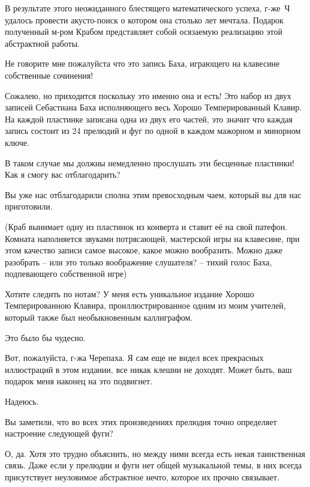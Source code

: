 \documentclass[../main.tex]{subfiles}
\begin{document}
\begin{dialogue}
 В результате этого неожиданного блестящего математического успеха, г-же~Ч удалось провести акусто-поиск о котором она столько лет мечтала. Подарок полученный м-ром Крабом представляет собой осязаемую реализацию этой абстрактной работы.

 Не говорите мне пожалуйста что это запись Баха, играющего на клавесине собственные сочинения!

 Сожалею, но приходится поскольку это именно она и есть! Это набор из двух записей Себастиана Баха исполняющего весь Хорошо Темперированный Клавир. На каждой пластинке записана одна из двух его частей, это значит что каждая запись состоит из 24 прелюдий и фуг по одной в каждом мажорном и минорном ключе.

 В таком случае мы должны немедленно прослушать эти бесценные пластинки! Как я смогу вас отблагодарить?

 Вы уже нас отблагодарили сполна этим превосходным чаем, который вы для нас приготовили.

(Краб вынимает одну из пластинок из конверта и ставит её на свой патефон. Комната наполняется звуками потрясающей, мастерской игры на клавесине, при этом качество записи самое высокое, какое можно вообразить. Можно даже разобрать \--- или это только воображение слушателя? \--- тихий голос Баха, подпевающего собственной игре)

 Хотите следить по нотам? У меня есть уникальное издание Хорошо Темперированною Клавира, проиллюстрированное одним из моим учителей, который также был необыкновенным каллиграфом.

 Это было бы чудесно.


 Вот, пожалуйста, г-жа Черепаха. Я сам еще не видел всех прекрасных иллюстраций в этом издании, все никак клешни не доходят. Может быть, ваш подарок меня наконец на это подвигнет.

 Надеюсь.

 Вы заметили, что во всех этих произведениях прелюдия точно определяет настроение следующей фуги?

 О, да. Хотя это трудно объяснить, но между ними всегда есть некая таинственная связь. Даже если у прелюдии и фуги нет общей музыкальной темы, в них всегда присутствует неуловимое абстрактное нечто, которое их прочно связывает.


\end{dialogue}
\end{document}
